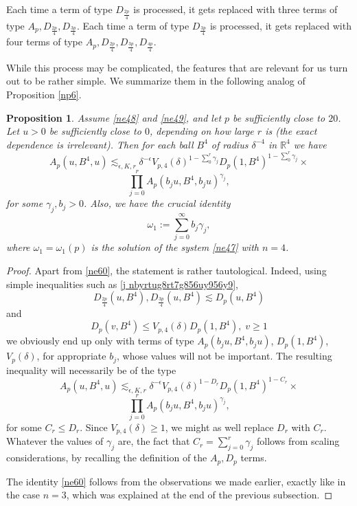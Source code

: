 \documentclass[amssymb,amsfonts,12pt]{amsart}
\newtheorem{proposition}[theorem]{Proposition}
\def\R{{\mathbb R}}
\begin{document}
Each time a term of type $D_{\frac{2p}{4}}$ is processed, it gets replaced with three terms of  type $A_p,D_{\frac{2p}{4}}, D_{\frac{3p}{4}}$. Each time a term of type $D_{\frac{3p}{4}}$ is processed, it gets replaced with four terms of  type $A_p,D_{\frac{2p}{4}}, D_{\frac{3p}{4}}, D_{\frac{4p}{4}}$.
\bigskip

While this process may be complicated, the features that are relevant for us turn out to be rather simple. We summarize them in the following analog of Proposition \ref{np6}.










\begin{proposition}
\label{np16}
Assume \eqref{ne48} and \eqref{ne49}, and let $p$ be sufficiently close to $20$. Let $u>0$ be sufficiently close to $0$, depending on how large $r$ is (the exact dependence is irrelevant).
Then for each ball $B^4$ of radius $\delta^{-4}$ in $\R^4$ we have
$$
A_p(u,B^4,u)\lesssim_{\epsilon,K,r}\delta^{-\epsilon}V_{p,4}(\delta)^{1-\sum_{0}^r\gamma_j}D_p(1,B^4)^{1-\sum_{0}^r\gamma_j}\times
$$
$$\prod_{j=0}^rA_p(b_ju,B^4,b_ju)^{\gamma_j},$$
for some $\gamma_j,b_j>0$.  Also, we have the crucial identity
\begin{equation}
\label{ne60}
\omega_1:=\sum_{j=0}^\infty b_j\gamma_j,
\end{equation}
where $\omega_1=\omega_1(p)$ is the solution of the system \eqref{ne47} with $n=4$.
\end{proposition}
\begin{proof}
Apart from \eqref{ne60}, the statement is rather tautological. Indeed, using simple inequalities such as \eqref{j nbyrtug8rt7g856uy956y9},
$$D_{\frac{2p}4}(u,B^4),D_{\frac{3p}4}(u,B^4)\lesssim D_{p}(u,B^4)$$
and
$$D_p(v,B^4)\le V_{p,4}(\delta)D_p(1,B^4),\;v\ge 1$$
we obviously end up only with terms of type $A_p(b_ju,B^4,b_ju)$, $D_p(1,B^4)$, $V_p(\delta)$, for appropriate $b_j$, whose values will not be important. The resulting inequality will necessarily be of the type
$$
A_p(u,B^4,u)\lesssim_{\epsilon,K,r}\delta^{-\epsilon}V_{p,4}(\delta)^{1-D_r}D_p(1,B^4)^{1-C_r}\times
$$
$$\prod_{j=0}^rA_p(b_ju,B^4,b_ju)^{\gamma_j},$$
for some $C_r\le D_r$. Since $V_{p,4}(\delta)\ge 1$, we might as well replace $D_r$ with $C_r$.
Whatever the values of $\gamma_j$ are, the fact that $C_r=\sum_{j=0}^r\gamma_j$ follows from scaling considerations, by recalling the definition of the $A_p,D_p$ terms.
\medskip

The identity \eqref{ne60} follows from the observations we made earlier, exactly like in the case $n=3$, which was explained at the end of the previous subsection.

\end{proof}
\end{document}
